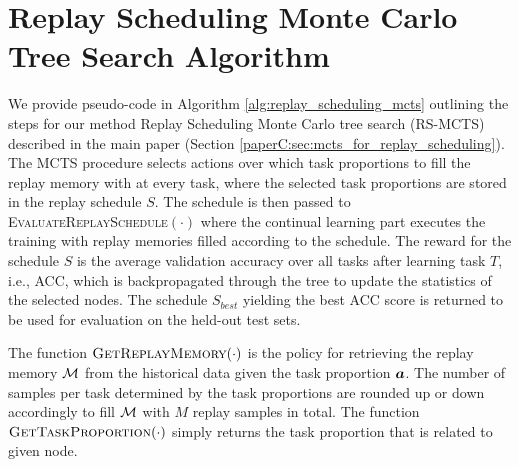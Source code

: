 

\section{Replay Scheduling Monte Carlo Tree Search Algorithm}\label{app:rs_mcts_algorithm}

%


We provide pseudo-code in Algorithm \ref{alg:replay_scheduling_mcts} outlining the steps for our method Replay Scheduling Monte Carlo tree search (RS-MCTS) described in the main paper (Section \ref{paperC:sec:mcts_for_replay_scheduling}). The MCTS procedure selects actions over which task proportions to fill the replay memory with at every task, where the selected task proportions are stored in the replay schedule $S$. The schedule is then passed to \textsc{EvaluateReplaySchedule$(\cdot)$} where the continual learning part executes the training with replay memories filled according to the schedule. The reward for the schedule $S$ is the average validation accuracy over all tasks after learning task $T$, i.e., ACC, which is backpropagated through the tree to update the statistics of the selected nodes. The schedule $S_{best}$ yielding the best ACC score is returned to be used for evaluation on the held-out test sets.

The function $\textsc{GetReplayMemory}(\cdot)$ is the policy for retrieving the replay memory ${\mathcal{M}}$ from the historical data given the task proportion ${\bm{a}}$. The number of samples per task determined by the task proportions are rounded up or down accordingly to fill ${\mathcal{M}}$ with $M$ replay samples in total. 
The function $\textsc{GetTaskProportion}(\cdot)$ simply returns the task proportion that is related to given node.


